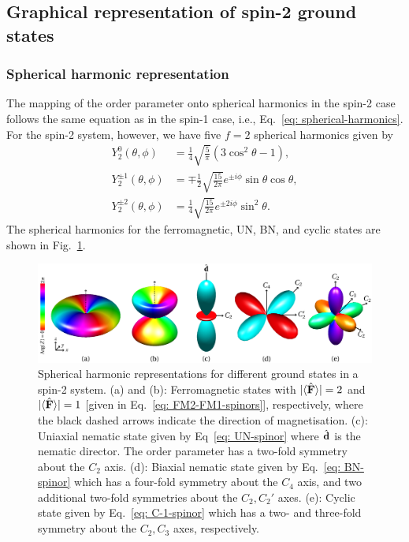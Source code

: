 \subsection{Graphical representation of spin-2 ground states}
\subsubsection{Spherical harmonic representation}
The mapping of the order parameter onto spherical harmonics in the spin-2 case
follows the same equation as in the spin-1 case, i.e.,
Eq.~\eqref{eq: spherical-harmonics}.
For the spin-2 system, however, we have five \(f=2\) spherical harmonics given
by
\begin{align}
    Y_2^0(\theta, \phi)       & = \frac{1}{4}\sqrt{\frac{5}{\pi}}
    (3\cos^2\theta - 1),                                                    \\
    Y_2^{\pm 1}(\theta, \phi) & =
    \mp \frac{1}{2}\sqrt{\frac{15}{2\pi}}e^{\pm i\phi}\sin\theta\cos\theta, \\
    Y_2^{\pm 2}(\theta, \phi) & =
    \frac{1}{4}\sqrt{\frac{15}{2\pi}}e^{\pm 2i\phi}\sin^2\theta.
\end{align}
The spherical harmonics for the ferromagnetic, UN, BN, and cyclic states
are shown in Fig.~\ref{fig: spin-2-spherical-harmonics}.
\begin{figure}
    \centering
    \includegraphics[width=\textwidth]
    {gfx/ch-groundStateSymmetries/spin-2-ground-states.pdf}
    \caption[Spherical harmonic representation of spin-2 ground states]
    {\label{fig: spin-2-spherical-harmonics}Spherical harmonic
        representations for different ground states in a spin-2 system.
        (a) and (b): Ferromagnetic states with \(|\langle \hat{\vb{F}} \rangle |=2\) and
        \(|\langle \hat{\vb{F}} \rangle |=1\) [given in Eq.~\eqref{eq: FM2-FM1-spinors}], respectively,
        where the black dashed arrows indicate the direction of magnetisation.
        (c): Uniaxial nematic state given by Eq~\eqref{eq: UN-spinor} where
        \(\hat{\vb{d}}\) is the nematic director.
        The order parameter has a two-fold symmetry about the \(C_2\) axis.
        (d): Biaxial nematic state given by Eq.~\eqref{eq: BN-spinor} which
        has a four-fold symmetry about the \(C_4\) axis, and two additional
        two-fold symmetries about the \(C_2, C_2'\) axes.
        (e): Cyclic state given by Eq.~\eqref{eq: C-1-spinor} which has a
        two- and three-fold symmetry about the \(C_2, C_3\) axes, respectively.}
\end{figure}
